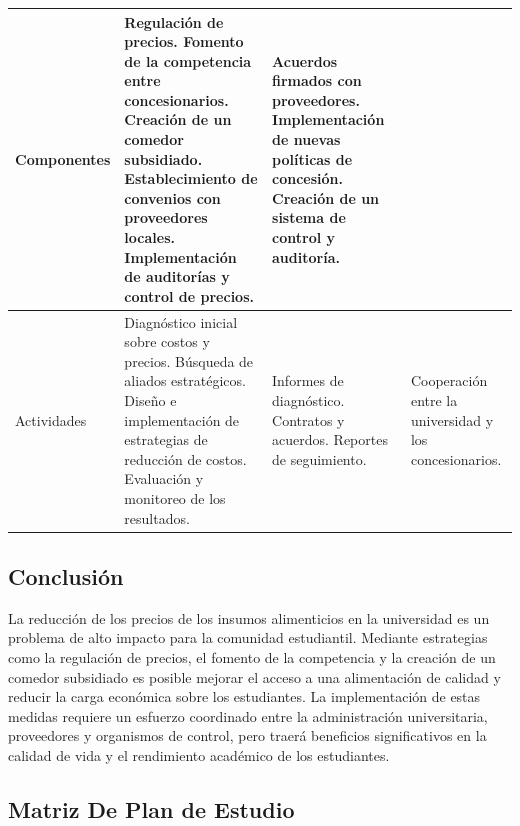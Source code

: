 \documentclass[letterpaper, 11pt]{report}
\begin{document}
\begin{longtable}{|p{.2\linewidth}|p{.2\linewidth}|p{.3\linewidth}|p{.2\linewidth}|}
      Componentes                                                                 & Regulación de precios. Fomento de la competencia entre
      concesionarios. Creación de un comedor subsidiado. Establecimiento de convenios
      con proveedores locales. Implementación de auditorías y control de precios. &
      Acuerdos firmados con proveedores. Implementación de nuevas políticas de
      concesión. Creación de un sistema de control y auditoría.                   &                                                                                                                                   \\\hline

      Actividades                                                                 & Diagnóstico inicial sobre costos y precios. Búsqueda de aliados
      estratégicos. Diseño e implementación de estrategias de reducción de costos.
      Evaluación y monitoreo de los resultados.                                   & Informes de diagnóstico. Contratos
      y acuerdos. Reportes de seguimiento.                                        & Cooperación entre la universidad y los
      concesionarios.                                                                                                                                                                                                 \\\hline

\end{longtable}

\subsection{Conclusión}

La reducción de los precios de los insumos alimenticios en la universidad es un
problema de alto impacto para la comunidad estudiantil. Mediante estrategias
como la regulación de precios, el fomento de la competencia y la creación de un
comedor subsidiado es posible mejorar el acceso a una alimentación de calidad y
reducir la carga económica sobre los estudiantes. La implementación de estas
medidas requiere un esfuerzo coordinado entre la administración universitaria,
proveedores y organismos de control, pero traerá beneficios significativos en
la calidad de vida y el rendimiento académico de los estudiantes.

\subsection{Matriz De Plan de Estudio}
\end{document}
